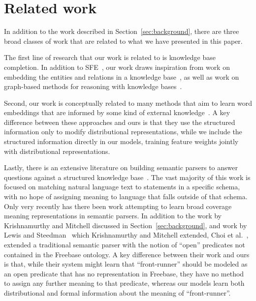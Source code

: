 \documentclass[11pt]{article}
\newcommand{\secref}[1]{Section~\ref{sec:#1}}
\begin{document}
\section{Related work}

In addition to the work described in \secref{background}, there are three broad
classes of work that are related to what we have presented in this paper.

The first line of research that our work is related to is knowledge base
completion.  In addition to SFE~\cite{gardner-2015-sfe}, our work draws
inspiration from work on embedding the entities and relations in a knowledge
base~\cite{riedel-2013-mf-universal-schema,%
nickel-2011-rescal,bordes-2013-transe,nickel-2014-are,%
toutanova-2015-joint-text-kb-embedding}, as well as work on graph-based methods
for reasoning with knowledge
bases~\cite{lao-2010-original-pra,gardner-2014-vector-space-pra,%
neelakantan-2015-rnn-kbc}.

Second, our work is conceptually related to many methods that aim to learn word
embeddings that are informed by some kind of external
knowledge~\cite{faruqui-2015-retrofitting-word-vectors,%
rocktaschel-2015-logical-embeddings,schwartz-2016-symmetric-patterns-w2v,%
yu-2014-w2v-with-semantic-knowledge}.  A key difference between these
approaches and ours is that they use the structured information only to modify
distributional representations, while we include the structured information
directly in our models, training feature weights jointly with distributional
representations.

Lastly, there is an extensive literature on building semantic parsers to answer
questions against a structured knowledge
base~\cite{zettlemoyer-2005-ccg,berant-2013-semantic-parsing-qa,%
kwiatkowski-2013-ontology-matching,krishnamurthy-2012-semantic-parsing,%
li-2015-semantic-parsing-scfg}.  The vast majority of this work is focused on
matching natural language text to statements in a specific schema, with no hope
of assigning meaning to language that falls outside of that schema.  Only very
recently has there been work attempting to learn broad coverage meaning
representations in semantic parsers.  In addition to the work by Krishnamurthy
and Mitchell discussed in \secref{background}, and work by Lewis and
Steedman~
which Krishnamurthy and Mitchell extended, Choi et
al.~, extended a
traditional semantic parser with the notion of ``open'' predicates not
contained in the Freebase ontology.  A key difference between their work and
ours is that, while their system might learn that ``front-runner'' should be
modeled as an open predicate that has no representation in Freebase, they have
no method to assign any further meaning to that predicate, whereas our models
learn both distributional and formal information about the meaning of
``front-runner''.
\end{document}
